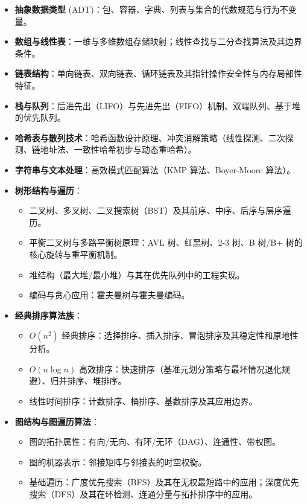 \begin{itemize}
    \item \textbf{抽象数据类型} (ADT)：包、容器、字典、列表与集合的代数规范与行为不变量。
    \item \textbf{数组与线性表}：一维与多维数组存储映射；线性查找与二分查找算法及其边界条件。
    \item \textbf{链表结构}：单向链表、双向链表、循环链表及其指针操作安全性与内存局部性特征。
    \item \textbf{栈与队列}：后进先出（LIFO）与先进先出（FIFO）机制、双端队列、基于堆的优先队列。
    \item \textbf{哈希表与散列技术}：哈希函数设计原理、冲突消解策略（线性探测、二次探测、链地址法、一致性哈希初步与动态重哈希）。
    \item \textbf{字符串与文本处理}：高效模式匹配算法（KMP 算法、Boyer-Moore 算法）。
    \item \textbf{树形结构与遍历}：
    \begin{itemize}
        \item 二叉树、多叉树、二叉搜索树（BST）及其前序、中序、后序与层序遍历。
        \item 平衡二叉树与多路平衡树原理：AVL 树、红黑树、2-3 树、B 树/B+ 树的核心旋转与重平衡机制。
        \item 堆结构（最大堆/最小堆）与其在优先队列中的工程实现。
        \item 编码与贪心应用：霍夫曼树与霍夫曼编码。
    \end{itemize}
    \item \textbf{经典排序算法族}：
    \begin{itemize}
        \item $O(n^2)$ 经典排序：选择排序、插入排序、冒泡排序及其稳定性和原地性分析。
        \item $O(n \log n)$ 高效排序：快速排序（基准元划分策略与最坏情况退化规避）、归并排序、堆排序。
        \item 线性时间排序：计数排序、桶排序、基数排序及其应用边界。
    \end{itemize}
    \item \textbf{图结构与图遍历算法}：
    \begin{itemize}
        \item 图的拓扑属性：有向/无向、有环/无环（DAG）、连通性、带权图。
        \item 图的机器表示：邻接矩阵与邻接表的时空权衡。
        \item 基础遍历：广度优先搜索（BFS）及其在无权最短路中的应用；深度优先搜索（DFS）及其在环检测、连通分量与拓扑排序中的应用。

\end{itemize}
\end{itemize}
